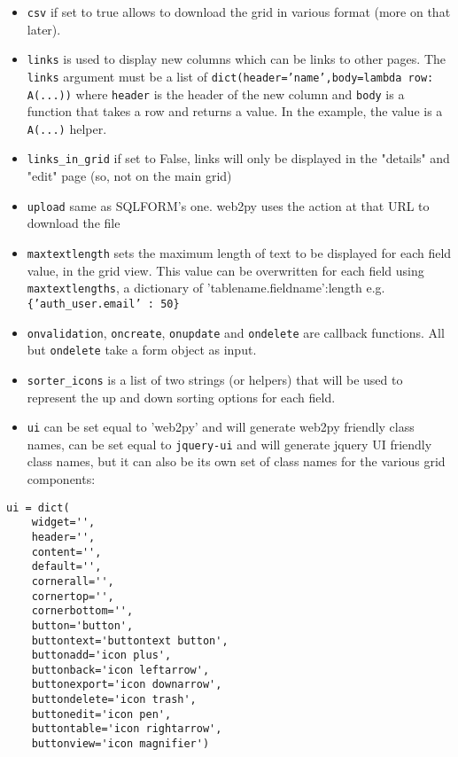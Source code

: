 \documentclass[justified,sixbynine,notoc]{tufte-book}
\def\ft{\small\tt}
\begin{document}
\begin{fullwidth}
\begin{itemize}
\item {\ft csv} if set to true allows to download the grid in various format (more on that later).

\item {\ft links} is used to display new columns which can be links to other pages. The {\ft links} argument must be a list of  {\ft dict(header='name',body=lambda row: A(...))} where {\ft header} is the header of the new column and {\ft body} is a function that takes a row and returns a value. In the example, the value is a {\ft A(...)} helper.

\item {\ft links\_in\_grid} if set to False, links will only be displayed in the "details" and "edit" page (so, not on the main grid)

\item {\ft upload} same as SQLFORM's one. web2py uses the action at that URL to download the file

\item {\ft maxtextlength} sets the maximum length of text to be displayed for each field value, in the grid view. This value can be overwritten for each field using {\ft maxtextlengths}, a dictionary of 'tablename.fieldname':length e.g. {\ft \{'auth\_user.email' : 50\}}

\item {\ft onvalidation}, {\ft oncreate}, {\ft onupdate} and {\ft ondelete} are callback functions. All but {\ft ondelete} take a form object as input.

\item {\ft sorter\_icons} is a list of two strings (or helpers) that will be used to represent the up and down sorting options for each field.

\item {\ft ui} can be set equal to 'web2py' and will generate web2py friendly class names, can be set equal to {\ft jquery-ui} and will generate jquery UI friendly class names, but it can also be its own set of class names for the various grid components:
\end{itemize}
\begin{lstlisting}
ui = dict(
    widget='',
    header='',
    content='',
    default='',
    cornerall='',
    cornertop='',
    cornerbottom='',
    button='button',
    buttontext='buttontext button',
    buttonadd='icon plus',
    buttonback='icon leftarrow',
    buttonexport='icon downarrow',
    buttondelete='icon trash',
    buttonedit='icon pen',
    buttontable='icon rightarrow',
    buttonview='icon magnifier')
\end{lstlisting}


\end{fullwidth}
\end{document}
